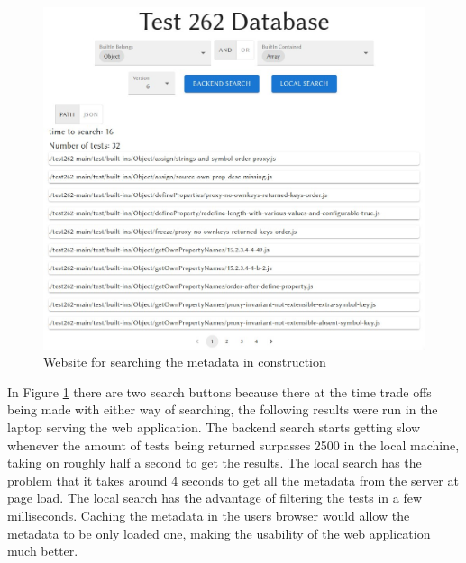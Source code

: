 \documentclass[runningheads]{llncs}
\begin{document}
\begin{figure}[ht]
    \centering
    \includegraphics[width=1\textwidth]{images/website.png}
    \caption{Website for searching the metadata in construction}
    \label{fig:website}
\end{figure}


In Figure \ref{fig:website} there are two search buttons because there at the time trade offs being made with either way of searching, the following results were run in the laptop serving the web application. The backend search starts getting slow whenever the amount of tests being returned surpasses 2500 in the local machine, taking on roughly half a second to get the results. The local search has the problem that it takes around 4 seconds to get all the metadata from the server at page load. The local search has the advantage of filtering the tests in a few milliseconds. Caching the metadata in the users browser would allow the metadata to be only loaded one, making the usability of the web application much better.
\end{document}
